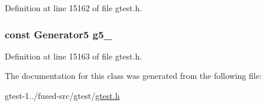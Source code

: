 \-Definition at line 15162 of file gtest.\-h.

\hypertarget{classtesting_1_1internal_1_1CartesianProductHolder5_ac153ca256cc6aabca132e9276e0b7e80}{
\subsubsection[{g5\-\_\-}]{\setlength{\rightskip}{0pt plus 5cm}const \-Generator5 {\bf g5\-\_\-}}}\label{d6/dd0/classtesting_1_1internal_1_1CartesianProductHolder5_ac153ca256cc6aabca132e9276e0b7e80}


\-Definition at line 15163 of file gtest.\-h.



\-The documentation for this class was generated from the following file\-:\begin{DoxyCompactItemize}
\item 
gtest-\/1../fused-\/src/gtest/\hyperlink{fused-src_2gtest_2gtest_8h}{gtest.\-h}\end{DoxyCompactItemize}
